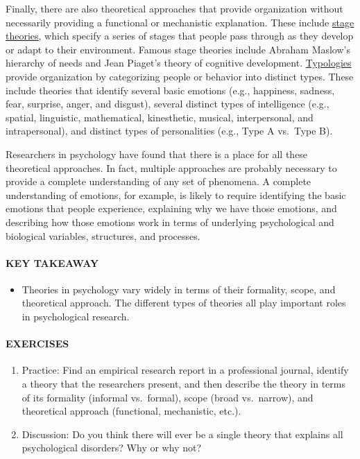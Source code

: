 \documentclass[
]{krantz}
\providecommand{\tightlist}{%
  \setlength{\itemsep}{0pt}\setlength{\parskip}{0pt}}
\begin{document}
Finally, there are also theoretical approaches that provide organization without necessarily providing a functional or mechanistic explanation. These include \hyperref[stage-theory]{stage theories}, which specify a series of stages that people pass through as they develop or adapt to their environment. Famous stage theories include Abraham Maslow's hierarchy of needs and Jean Piaget's theory of cognitive development. \hyperref[typology]{Typologies} provide organization by categorizing people or behavior into distinct types. These include theories that identify several basic emotions (e.g., happiness, sadness, fear, surprise, anger, and disgust), several distinct types of intelligence (e.g., spatial, linguistic, mathematical, kinesthetic, musical, interpersonal, and intrapersonal), and distinct types of personalities (e.g., Type A vs.~Type B).

Researchers in psychology have found that there is a place for all these theoretical approaches. In fact, multiple approaches are probably necessary to provide a complete understanding of any set of phenomena. A complete understanding of emotions, for example, is likely to require identifying the basic emotions that people experience, explaining why we have those emotions, and describing how those emotions work in terms of underlying psychological and biological variables, structures, and processes.

\paragraph*{KEY TAKEAWAY}\label{key-takeaway}

\begin{itemize}
\tightlist
\item
  Theories in psychology vary widely in terms of their formality, scope, and theoretical approach. The different types of theories all play important roles in psychological research.
\end{itemize}

\paragraph*{EXERCISES}\label{exercises-23}

\begin{enumerate}
\def\labelenumi{\arabic{enumi}.}
\tightlist
\item
  Practice: Find an empirical research report in a professional journal, identify a theory that the researchers present, and then describe the theory in terms of its formality (informal vs.~formal), scope (broad vs.~narrow), and theoretical approach (functional, mechanistic, etc.).
\item
  Discussion: Do you think there will ever be a single theory that explains all psychological disorders? Why or why not?
\end{enumerate}
\end{document}
